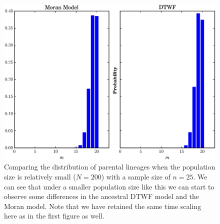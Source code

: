 \documentclass[11pt]{article}
\begin{document}
\begin{center}
	\begin{figure}[!ht]
		\includegraphics[scale=0.85]{../plots/moran_figure2}
		\caption{Comparing the distribution of parental lineages when the population size is relatively small ($N = 200$) with a sample size of $n=25$. We can see that under a smaller population size like this we can start to observe some differences in the ancestral DTWF model and the Moran model. Note that we have retained the same time scaling here as in the first figure as well.}
	\end{figure}
\end{center}
\end{document}
